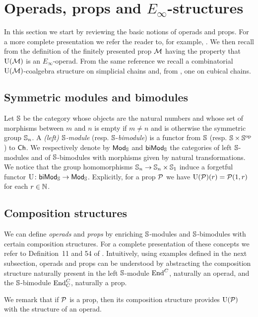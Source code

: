 
\section{Operads, props and \texorpdfstring{$E_\infty$}{E-infty}-structures} \label{s:operads and props}

In this section we start by reviewing the basic notions of operads and props.
For a more complete presentation we refer the reader to, for example, \cite{markl2008props}.
We then recall from \cite{medina2020prop1} the definition of the finitely presented prop $\M$ having the property that $\UM$ is an $E_{\infty}$-operad.
From the same reference we recall a combinatorial $\UM$-coalgebra structure on simplicial chains and, from \cite{medina2021cubical}, one on cubical chains.

\subsection{Symmetric modules and bimodules}

Let $\S$ be the category whose objects are the natural numbers and whose set of morphisms between $m$ and $n$ is empty if $m \neq n$ and is otherwise the symmetric group $\S_n$.
A \textit{(left) $\S$-module} (resp. $\S$-\textit{bimodule}) is a functor from $\S$ (resp. $\S \times \S^\op$) to $\Ch$.
We respectively denote by $\smod$ and $\sbimod$ the categories of left $\S$-modules and of $\S$-bimodules with morphisms given by natural transformations.
We notice that the group homomorphisms $\S_n \to \S_n \times \S_1$ induce a forgetful functor $\U \colon \sbimod \to \smod$.
Explicitly, for a prop $\P$ we have $\U(\P)(r) = \P(1, r)$ for each $r \in \N$.

\subsection{Composition structures}

We can define \textit{operads} and \textit{props} by enriching $\S$-modules and $\S$-bimodules with certain composition structures.
For a complete presentation of these concepts we refer to Definition~11 and 54 of \cite{markl2008props}.
Intuitively, using examples defined in the next subsection, operads and props can be understood by abstracting the composition structure naturally present in the left $\S$-module $\End^C$, naturally an operad, and the $\S$-bimodule $\End^C_C$, naturally a prop.

We remark that if $\P$ is a prop, then its composition structure provides $\U(\P)$ with the structure of an operad.

